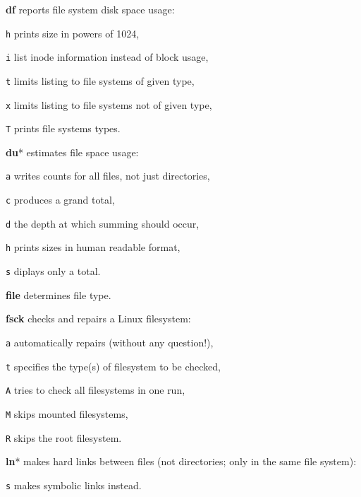 \begin{enumx}
	\item [\cmd] \textbf{df} reports file system disk space usage:
	\item [\texttt{h}] prints size in powers of 1024,
	\item [\texttt{i}] list inode information instead of block usage,
	\item [\texttt{t}] limits listing to file systems of given type,
	\item [\texttt{x}] limits listing to file systems not of given type,
	\item [\texttt{T}] prints file systems types.
	
	\item [\cmd] \textbf{du}* estimates file space usage:
	\item [\texttt{a}] writes counts for all files, not just directories,
	\item [\texttt{c}] produces a grand total,
	\item [\texttt{d}] the depth at which summing should occur,
	\item [\texttt{h}] prints sizes in human readable format,
	\item [\texttt{s}] diplays only a total.
\end{enumx}

\begin{enumx}
	\item [\cmd] \textbf{file} determines file type.
\end{enumx}

\begin{enumx}
	\item [\cmd] \textbf{fsck} checks and repairs a Linux filesystem:
	\item [\texttt{a}] automatically repairs (without any question!),
	\item [\texttt{t}] specifies the type(s) of filesystem to be checked,
	\item [\texttt{A}] tries to check all filesystems in one run,
	\item [\texttt{M}] skips mounted filesystems,
	\item [\texttt{R}] skips the root filesystem.
\end{enumx}


\begin{enumx}
	\item [\cmd] \textbf{ln}* makes hard links between files
	(not directories; only in the same file system):
	\item [\texttt{s}]  makes symbolic links instead.
\end{enumx}


